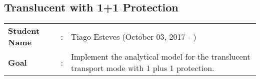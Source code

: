 \clearpage

\subsection{Translucent with 1+1 Protection}\label{analytical_Transluc_Protection}
\begin{tcolorbox}	
\begin{tabular}{p{2.75cm} p{0.2cm} p{10.5cm}} 	
\textbf{Student Name}  &:& Tiago Esteves    (October 03, 2017 - )\\
\textbf{Goal}          &:& Implement the analytical model for the translucent transport mode with 1 plus 1 protection.
\end{tabular}
\end{tcolorbox}
\vspace{11pt}

